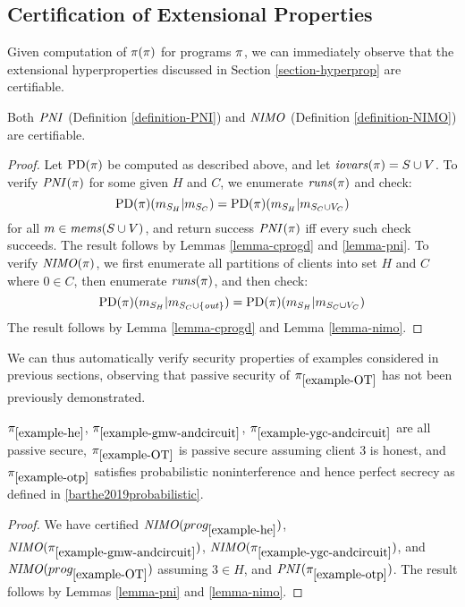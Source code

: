 \subsection{Certification of Extensional Properties}

Given computation of $\pi(\pi)$ for programs $\pi$, we can
immediately observe that the extensional hyperproperties discussed in
Section \ref{section-hyperprop} are certifiable.
\begin{lemma}
  Both $\mathit{PNI}$ (Definition \ref{definition-PNI}) and $\mathit{NIMO}$ (Definition \ref{definition-NIMO}) are certifiable. 
\end{lemma}

\begin{proof}
  Let $\mathrm{PD}(\pi)$ be computed as described above, and let $\mathit{iovars}(\pi) = S
  \cup V$. To verify $\mathit{PNI}(\pi)$ for
  some given $H$ and $C$, we enumerate $\mathit{runs}(\pi)$ and check:
  $$
  \mathrm{PD}(\pi)(m_{S_H}|m_{S_C}) =
  \mathrm{PD}(\pi)(m_{S_H}|m_{S_C \cup V_C})
  $$
  for all $m \in \mathit{mems}(S \cup V)$, and return success $\mathit{PNI}(\pi)$ iff every such
  check succeeds. The result follows by Lemmas \ref{lemma-cprogd} and \ref{lemma-pni}.
  To verify $\mathit{NIMO}(\pi)$, we first enumerate all partitions of clients
  into set $H$ and $C$ where $0 \in C$, then enumerate $\mathit{runs}(\pi)$, and
  then check:
  $$
  \mathrm{PD}(\pi)(m_{S_H}|m_{S_C \cup \{\mathit{out}\}}) =
  \mathrm{PD}(\pi)(m_{S_H}|m_{S_C \cup V_C})
  $$
  The result follows by Lemma \ref{lemma-cprogd} and Lemma \ref{lemma-nimo}.
\end{proof}

We can thus automatically verify security properties of examples considered
in previous sections, observing that passive security of $\pi_{\ref{example-OT}}$
has not been previously demonstrated.
\begin{lemma}
  $\pi_{\ref{example-he}}$, $\pi_{\ref{example-gmw-andcircuit}}$,
  $\pi_{\ref{example-ygc-andcircuit}}$ are all passive secure,
  $\pi_{\ref{example-OT}}$ is passive secure assuming client 3 is
  honest, and $\pi_{\ref{example-otp}}$ satisfies probabilistic
  noninterference and hence perfect secrecy as defined in
  \ref{barthe2019probabilistic}.
\end{lemma}
\begin{proof}
  We have certified $\mathit{NIMO}(prog_{\ref{example-he}})$, $\mathit{NIMO}(\pi_{\ref{example-gmw-andcircuit}})$,
  $\mathit{NIMO}(\pi_{\ref{example-ygc-andcircuit}})$, and $\mathit{NIMO}(prog_{\ref{example-OT}})$ assuming
  $3 \in H$, and $\mathit{PNI}(\pi_{\ref{example-otp}})$. The result follows by Lemmas
  \ref{lemma-pni} and \ref{lemma-nimo}.
\end{proof}

